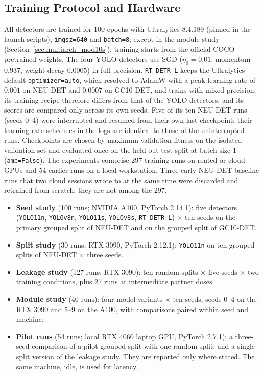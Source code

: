 \documentclass[pdflatex,sn-apa]{sn-jnl}
\begin{document}
\subsection{Training Protocol and Hardware}
All detectors are trained for 100 epochs with Ultralytics 8.4.189 (pinned in the launch scripts), \texttt{imgsz=640} and \texttt{batch=8}; except in the module study (Section~\ref{sec:multiarch_mod10s}), training starts from the official COCO-pretrained weights. The four YOLO detectors use SGD ($\eta_0=0.01$, momentum $0.937$, weight decay $0.0005$) in full precision. \texttt{RT-DETR-L} keeps the Ultralytics default \texttt{optimizer=auto}, which resolved to AdamW with a peak learning rate of $0.001$ on NEU-DET and $0.0007$ on GC10-DET, and trains with mixed precision; its training recipe therefore differs from that of the YOLO detectors, and its scores are compared only across its own seeds. Five of its ten NEU-DET runs (seeds 0--4) were interrupted and resumed from their own last checkpoint; their learning-rate schedules in the logs are identical to those of the uninterrupted runs. Checkpoints are chosen by maximum validation fitness on the isolated validation set and evaluated once on the held-out test split at batch size 1 (\texttt{amp=False}).
The experiments comprise 297 training runs on rented or cloud GPUs and 54 earlier runs on a local workstation. Three early NEU-DET baseline runs that two cloud sessions wrote to at the same time were discarded and retrained from scratch; they are not among the 297.
\begin{itemize}[leftmargin=2em, itemsep=0.1em]
    \item \textbf{Seed study} (100 runs; NVIDIA A100, PyTorch 2.14.1): five detectors (\texttt{YOLO11n}, \texttt{YOLOv8n}, \texttt{YOLO11s}, \texttt{YOLOv8s}, \texttt{RT-DETR-L}) $\times$ ten seeds on the primary grouped split of NEU-DET and on the grouped split of GC10-DET.
    \item \textbf{Split study} (30 runs; RTX 3090, PyTorch 2.12.1): \texttt{YOLO11n} on ten grouped splits of NEU-DET $\times$ three seeds.
    \item \textbf{Leakage study} (127 runs; RTX 3090): ten random splits $\times$ five seeds $\times$ two training conditions, plus 27 runs at intermediate partner doses.
    \item \textbf{Module study} (40 runs): four model variants $\times$ ten seeds; seeds 0--4 on the RTX 3090 and 5--9 on the A100, with comparisons paired within seed and machine.
    \item \textbf{Pilot runs} (54 runs; local RTX 4060 laptop GPU, PyTorch 2.7.1): a three-seed comparison of a pilot grouped split with one random split, and a single-split version of the leakage study. They are reported only where stated. The same machine, idle, is used for latency.
\end{itemize}
\end{document}
